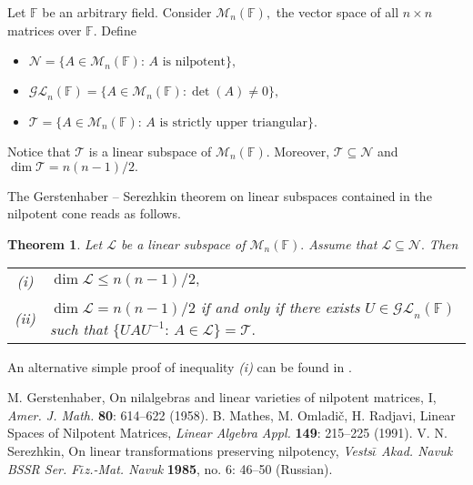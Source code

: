\documentclass[12pt]{article}
\newtheorem{thm}{Theorem}
\begin{document}
Let $\mathbb{F}$ be an arbitrary field. Consider $\mathcal{M}_n (\mathbb{F}),$ the vector space of all $n \times n$ matrices over $\mathbb{F}.$ Define
\begin{itemize}
\item
$\mathcal{N} = \{A \in \mathcal{M}_n (\mathbb{F}):\, A\, \, \mbox{is nilpotent}\},$
\item
$\mathcal{GL}_n (\mathbb{F}) = \{A \in \mathcal{M}_n (\mathbb{F}): \det (A) \neq 0\},$
\item
$\mathcal{T} = \{A \in \mathcal{M}_n (\mathbb{F}):\, A\, \, \mbox{is strictly upper triangular}\}.$
\end{itemize}

Notice that $\mathcal{T}$ is a linear subspace of $\mathcal{M}_n (\mathbb{F}).$ Moreover, $\mathcal{T} \subseteq \mathcal{N}$ and $\dim \mathcal{T} = n (n - 1) / 2.$

The Gerstenhaber -- Serezhkin theorem on linear subspaces contained in the nilpotent cone \cite{G, S} reads as follows.
\begin{thm}
Let $\mathcal{L}$ be a linear subspace of $\mathcal{M}_n (\mathbb{F}).$ Assume that $\mathcal{L} \subseteq \mathcal{N}.$ Then\\
\begin{tabular}{cl}
(i)&$\dim \mathcal{L} \leq n (n - 1) / 2,$\\
(ii)&$\dim \mathcal{L} = n (n - 1) / 2$ if and only if there exists $U \in \mathcal{GL}_n (\mathbb{F})$ such that $\{U A U^{-1}:\, A \in \mathcal{L}\} = \mathcal{T}.$\\
\end{tabular} 
\end{thm}

An alternative simple proof of inequality {\it (i)} can be found in \cite{M}.

\begin{thebibliography}{99}
M. Gerstenhaber, On nilalgebras and linear varieties of nilpotent matrices, I, {\it Amer. J. Math.} {\bf 80}: 614--622 (1958).
B. Mathes, M. Omladi\v{c}, H. Radjavi, Linear Spaces of Nilpotent Matrices, {\it Linear Algebra Appl.} {\bf 149}: 215--225 (1991).
V. N. Serezhkin, On linear transformations preserving nilpotency, {\it Vests$\bar{\iota}$ Akad. Navuk BSSR Ser. F$\bar{\iota}$z.-Mat. Navuk} {\bf 1985}, no. 6: 46--50 (Russian).  
\end{thebibliography}
\end{document}
